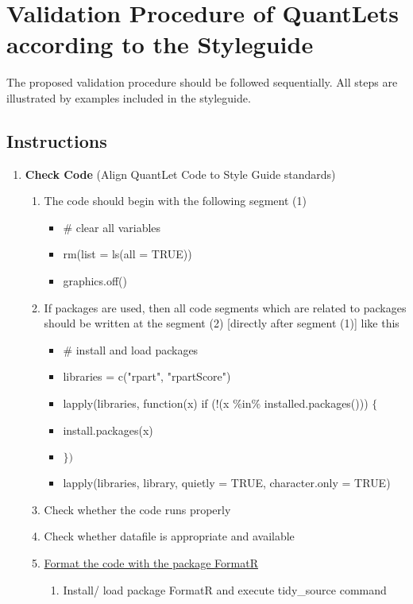 \documentclass{article}
\begin{document}
\section*{Validation Procedure of QuantLets according to the Styleguide}
The proposed validation procedure should be followed sequentially. All steps are illustrated by examples included in the styleguide.

\subsection*{Instructions} %
\begin{enumerate}[label*=\arabic*.]
	\item \textbf{Check Code} (Align QuantLet Code to Style Guide standards) 
	\begin {enumerate}[label*=\arabic*.]
		\item The code should begin with the following segment (1)
		\begin{itemize}
				\item  $\#$ clear all variables
				\item rm(list = ls(all = TRUE))
				\item graphics.off() 												
		\end{itemize}
		\item If packages are used, then all code segments which are related to packages should be written at the segment (2) [directly after segment (1)] like this
		\begin{itemize}
				\item  $\#$ install and load packages
				\item libraries = c("rpart", "rpartScore")
				\item lapply(libraries, function(x) if (!(x $\%$in$\%$ installed.packages())) $\{$
				\item install.packages(x)	
				\item $\})$			
				\item lapply(libraries, library, quietly = TRUE, character.only = TRUE)							
		\end{itemize}
		\item Check whether the code runs properly
		\item Check whether datafile is appropriate and available
				\item \label{formatR-ini}\hyperref[formatR]{Format the code with the package FormatR}
			\begin{enumerate}[label*=\arabic*.]
				\item Install/ load package FormatR and execute tidy\_source command

\end{enumerate}
\end{enumerate}
\end{enumerate}
\end{document}
